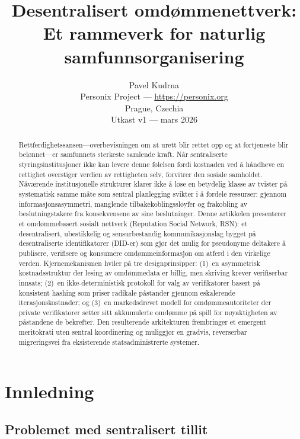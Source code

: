 \documentclass[11pt,a4paper,twocolumn]{article}
\title{\textbf{Desentralisert omdømmenettverk:\\Et rammeverk for naturlig samfunnsorganisering}}
\author{Pavel Kudrna\\Personix Project --- \url{https://personix.org}\\Prague, Czechia\\Utkast v1 --- mars 2026}
\date{}
\begin{document}
\maketitle

\begin{abstract}
Rettferdighetssansen---overbevisningen om at urett blir rettet opp og at fortjeneste blir belønnet---er samfunnets sterkeste samlende kraft. Når sentraliserte styringsinstitusjoner ikke kan levere denne følelsen fordi kostnaden ved å håndheve en rettighet overstiger verdien av rettigheten selv, forvitrer den sosiale samholdet. Nåværende institusjonelle strukturer klarer ikke å løse en betydelig klasse av tvister på systematisk samme måte som sentral planlegging svikter i å fordele ressurser: gjennom informasjonsasymmetri, manglende tilbakekoblingssløyfer og frakobling av beslutningstakere fra konsekvensene av sine beslutninger. Denne artikkelen presenterer et omdømmebasert sosialt nettverk (Reputation Social Network, RSN): et desentralisert, ubestikkelig og sensurbestandig kommunikasjonslag bygget på desentraliserte identifikatorer (DID-er) som gjør det mulig for pseudonyme deltakere å publisere, verifisere og konsumere omdømmeinformasjon om atferd i den virkelige verden. Kjernemekanismen hviler på tre designprinsipper: (1)~en asymmetrisk kostnadsstruktur der lesing av omdømmedata er billig, men skriving krever verifiserbar innsats; (2)~en ikke-deterministisk protokoll for valg av verifikatorer basert på konsistent hashing som priser radikale påstander gjennom eskalerende iterasjonskostnader; og (3)~en markedsdrevet modell for omdømmeautoriteter der private verifikatorer setter sitt akkumulerte omdømme på spill for nøyaktigheten av påstandene de bekrefter. Den resulterende arkitekturen frembringer et emergent meritokrati uten sentral koordinering og muliggjør en gradvis, reverserbar migreringsvei fra eksisterende statsadministrerte systemer.
\end{abstract}

\section{Innledning}

\subsection{Problemet med sentralisert tillit}
\end{document}
